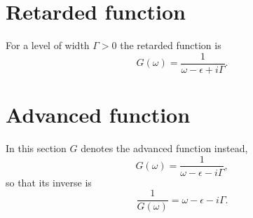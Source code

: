 \documentclass{article}
\begin{document}
\section{Retarded function}
For a level of width $\Gamma>0$ the retarded function is
\begin{equation}
G(\omega) = \frac{1}{\omega-\epsilon+i\Gamma} .
\label{eq:gr}
\end{equation}
\section{Advanced function}
In this section $G$ denotes the advanced function instead,
\begin{equation}
G(\omega) = \frac{1}{\omega-\epsilon-i\Gamma} ,
\label{eq:ga}
\end{equation}
so that its inverse is
\begin{equation}
\frac{1}{G(\omega)} = \omega - \epsilon - i\Gamma .
\label{eq:inv}
\end{equation}
\end{document}
